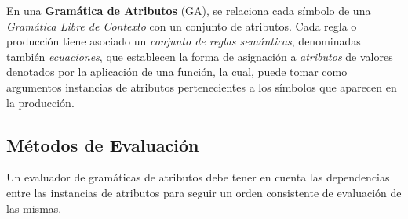 \documentclass[runningheads,a4paper]{llncs}
\begin{document}
% 
% 
% 
% 
%       
% 
%       
% 
% 

En una \textbf{Gramática de Atributos} (GA), se relaciona cada símbolo de una \textit{Gramática Libre de Contexto} con un conjunto de atributos. Cada regla o producción tiene asociado un \textit{conjunto de reglas semánticas}, denominadas también \textit{ecuaciones}, que establecen la forma de asignación a \textit{atributos} de valores denotados por la aplicación de una función, la cual, puede tomar como argumentos instancias de atributos pertenecientes a los símbolos que aparecen en la producción.


\subsection{Métodos de Evaluación}
\label{sec:met_eval}
Un evaluador de gramáticas de atributos debe tener en cuenta las dependencias entre las instancias de atributos para seguir un orden consistente de evaluación de las mismas.
\end{document}

